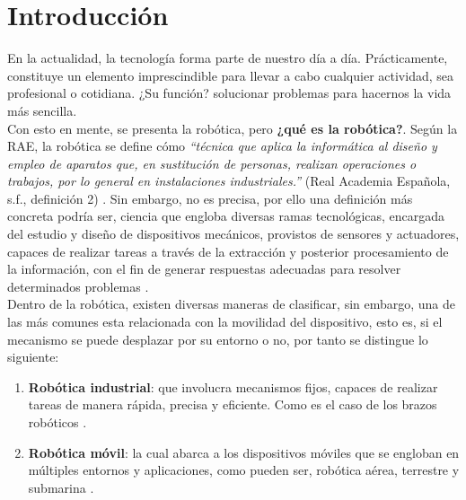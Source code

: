 \chapter{Introducción}
\label{cap:capitulo1}
\setcounter{page}{1}

En la actualidad, la tecnología forma parte de nuestro día a día. Prácticamente, constituye un elemento imprescindible para llevar a cabo cualquier actividad, sea profesional o cotidiana. ¿Su función? solucionar problemas para hacernos la vida más sencilla.\\

Con esto en mente, se presenta la robótica, pero \textbf{¿qué es la robótica?}. Según la \ac{RAE}, la robótica se define cómo \emph{``técnica que aplica la informática al diseño y empleo de aparatos que, en sustitución de personas, realizan operaciones o trabajos, por lo general en instalaciones industriales.''} (Real Academia Española, s.f., definición 2) \cite{rae-robotica}. Sin embargo, no es precisa, por ello una definición más concreta podría ser, ciencia que engloba diversas ramas tecnológicas, encargada del estudio y diseño de dispositivos mecánicos, provistos de sensores y actuadores, capaces de realizar tareas a través de la extracción y posterior procesamiento de la información, con el fin de generar respuestas adecuadas para resolver determinados problemas \cite{revista-de-robots}.\\

Dentro de la robótica, existen diversas maneras de clasificar, sin embargo, una de las más comunes esta relacionada con la movilidad del dispositivo, esto es, si el mecanismo se puede desplazar por su entorno o no, por tanto se distingue lo siguiente:

\begin{enumerate}
	\item \textbf{Robótica industrial}: que involucra mecanismos fijos, capaces de realizar tareas de manera rápida, precisa y eficiente. Como es el caso de los brazos robóticos \cite{industrial-robot}.

	\item \textbf{Robótica móvil}: la cual abarca a los dispositivos móviles que se engloban en múltiples entornos y aplicaciones, como pueden ser, robótica aérea, terrestre y submarina \cite{mobile-robot}.
\end{enumerate}

